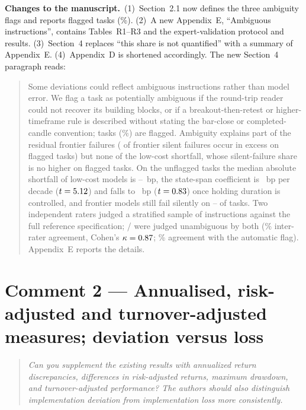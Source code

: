 \documentclass[11pt,a4paper]{article}
\newenvironment{reviewer}{\par\medskip\noindent\begin{quote}\itshape}{\end{quote}\par}
\newcommand{\changes}{\par\medskip\noindent\textbf{Changes to the manuscript.}\ }
\newenvironment{newtext}{\par\medskip\noindent\begin{quote}\small\color{blue!60!black}}{\end{quote}\par}
\begin{document}
\changes (1)~Section~2.1 now defines the three ambiguity flags and reports \RevAmbCount{} flagged tasks (\RevAmbShare\%). (2)~A new Appendix~E, ``Ambiguous instructions'', contains Tables~R1--R3 and the expert-validation protocol and results. (3)~Section~4 replaces ``this share is not quantified'' with a summary of Appendix~E. (4)~Appendix~D is shortened accordingly. The new Section~4 paragraph reads:
\begin{newtext}
Some deviations could reflect ambiguous instructions rather than model error. We flag a task as potentially ambiguous if the round-trip reader could not recover its building blocks, or if a breakout-then-retest or higher-timeframe rule is described without stating the bar-close or completed-candle convention; \RevAmbCount{} tasks (\RevAmbShare\%) are flagged. Ambiguity explains part of the residual frontier failures (\RevAttrFrontShare{} of frontier silent failures occur in excess on flagged tasks) but none of the low-cost shortfall, whose silent-failure share is no higher on flagged tasks. On the \RevUnambCount{} unflagged tasks the median absolute shortfall of low-cost models is \RevUnambGptISMed--\RevUnambQwenSISMed~bp, the state-span coefficient is \RevUnambTau~bp per decade ($t=5.12$) and falls to \RevUnambExpoTau~bp ($t=0.83$) once holding duration is controlled, and frontier models still fail silently on \RevUnambOpusSilent--\RevUnambDSProSilent{} of tasks. Two independent raters judged a stratified sample of \RevAuditN{} instructions against the full reference specification; \RevAuditBothUnamb/\RevAuditN{} were judged unambiguous by both (\RevAuditAgreePct\% inter-rater agreement, Cohen's $\kappa=0.87$; \RevAuditAutoAgreePct\% agreement with the automatic flag). Appendix~E reports the details.
\end{newtext}

\section*{Comment 2 --- Annualised, risk-adjusted and turnover-adjusted measures; deviation versus loss}
\begin{reviewer}
Can you supplement the existing results with annualized return discrepancies, differences in risk-adjusted returns, maximum drawdown, and turnover-adjusted performance? The authors should also distinguish implementation deviation from implementation loss more consistently.
\end{reviewer}
\end{document}

